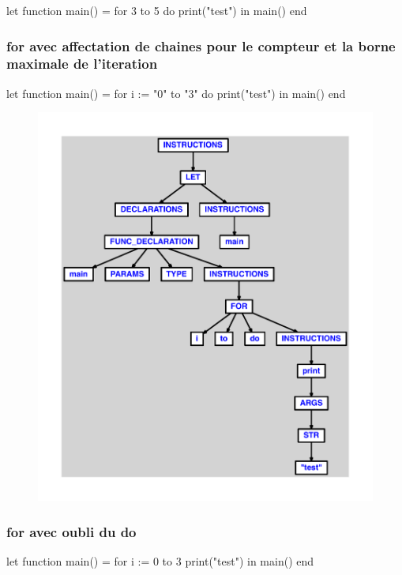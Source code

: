 \documentclass{article}
\begin{document}
\begin{verbatimtab}
let
	function main() =
		for 3 to 5 do
			print("test")
in main() end
\end{verbatimtab}
\subsubsection{for avec affectation de chaines pour le compteur et la borne maximale de l'iteration}
\begin{verbatimtab}
let
	function main() =
		for i := "0" to "3" do
			print("test")
in main() end
\end{verbatimtab}
\begin{figure}[H]\centering\includegraphics[max width=\textwidth]{ast/ast_188.pdf}\end{figure}\subsubsection{for avec oubli du do}
\begin{verbatimtab}
let
	function main() =
		for i := 0 to 3
			print("test")
in main() end
\end{verbatimtab}
\end{document}
